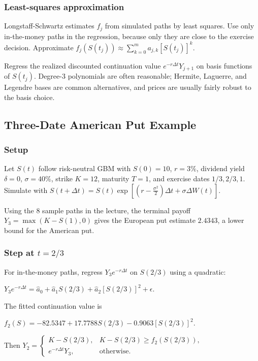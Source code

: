 \subsubsection*{Least-squares approximation}

Longstaff-Schwartz estimates $f_j$ from simulated paths by least squares. Use only in-the-money paths in the regression, because only they are close to the exercise decision. Approximate
$f_j(S(t_j))\approx\sum_{k=0}^m a_{j,k}[S(t_j)]^k$.

Regress the realized discounted continuation value $e^{-r\Delta t}Y_{j+1}$ on basis functions of $S(t_j)$. Degree-$3$ polynomials are often reasonable; Hermite, Laguerre, and Legendre bases are common alternatives, and prices are usually fairly robust to the basis choice.

\subsection{Three-Date American Put Example}

\subsubsection*{Setup}

Let $S(t)$ follow risk-neutral GBM with $S(0)=10$, $r=3\%$, dividend yield $\delta=0$, $\sigma=40\%$, strike $K=12$, maturity $T=1$, and exercise dates $1/3,2/3,1$. Simulate with
$S(t+\Delta t)=S(t)\exp\left[\left(r-\frac{\sigma^2}{2}\right)\Delta t+\sigma\Delta W(t)\right]$.

Using the 8 sample paths in the lecture, the terminal payoff $Y_3=\max(K-S(1),0)$ gives the European put estimate $2.4343$, a lower bound for the American put.

\subsubsection*{Step at $t=2/3$}

For in-the-money paths, regress $Y_3e^{-r\Delta t}$ on $S(2/3)$ using a quadratic:

$Y_3e^{-r\Delta t}=\hat a_0+\hat a_1S(2/3)+\hat a_2[S(2/3)]^2+\epsilon$.

The fitted continuation value is

$f_2(S)=-82.5347+17.7788S(2/3)-0.9063[S(2/3)]^2$.

Then
$Y_2=\begin{cases}K-S(2/3),&K-S(2/3)\ge f_2(S(2/3)),\\ e^{-r\Delta t}Y_3,&\text{otherwise}.\end{cases}$

